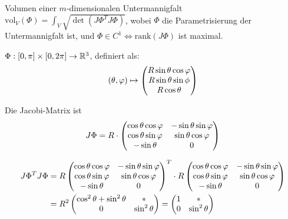\documentclass[12pt]{article}
\begin{document}
\begin{definition}{Volumen einer $m$-dimensionalen Untermannigfalt}{}
    $\mathrm{vol}_V(\Phi) = \int_V \sqrt{\det(J\Phi^T J \Phi)}$, wobei $\Phi$ die Parametrisierung der Untermannigfalt ist, und $\Phi \in C^1 \iff \mathrm{rank}(J \Phi)$ ist maximal. 
\end{definition}

\begin{example}{}{}
    $\Phi: [0, \pi] \times [0, 2\pi] \rightarrow \mathbb{R}^3$, definiert als:
    $$
        (\theta, \varphi) \mapsto \begin{pmatrix} R \sin \theta \cos \varphi \\ R \sin \theta \sin \phi \\ R \cos \theta \end{pmatrix}
    $$  

    Die Jacobi-Matrix ist
    $$
        J \Phi = R \cdot \begin{pmatrix} \cos\theta\cos\varphi & -\sin\theta\sin\varphi \\ \cos\theta\sin\varphi & \sin\theta \cos\varphi \\ -\sin\theta & 0 \end{pmatrix}
    $$

    $$
    \begin{aligned}
        J \Phi^T J \Phi &= R \begin{pmatrix} \cos\theta\cos\varphi & -\sin\theta\sin\varphi \\ \cos\theta\sin\varphi & \sin\theta \cos\varphi \\ -\sin\theta & 0 \end{pmatrix}^T \cdot R \begin{pmatrix} \cos\theta\cos\varphi & -\sin\theta\sin\varphi \\ \cos\theta\sin\varphi & \sin\theta \cos\varphi \\ -\sin\theta & 0 \end{pmatrix} \\
        &= R^2 \begin{pmatrix}
                \cos^2\theta + \sin^2\theta & * \\
                0 & \sin^2\theta \\
            \end{pmatrix} = 
            \begin{pmatrix}
                1 & * \\
                0 & \sin^2\theta \\
            \end{pmatrix}
    \end{aligned}
    $$


\end{example}
\end{document}
